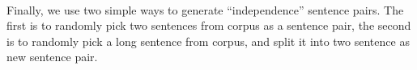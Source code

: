 \documentclass[12pt]{article}
\begin{document}
\begin{CJK*}{UTF8}{bkai}
\begin{spacing}{1.77}
\paragraph{}
Finally, we use two simple ways to generate ``independence'' sentence pairs. The first is to randomly pick two sentences from corpus as a sentence pair, the second is to randomly pick a long sentence from corpus, and split it into two sentence as new sentence pair.





\end{spacing}
\end{CJK*}
\end{document}

